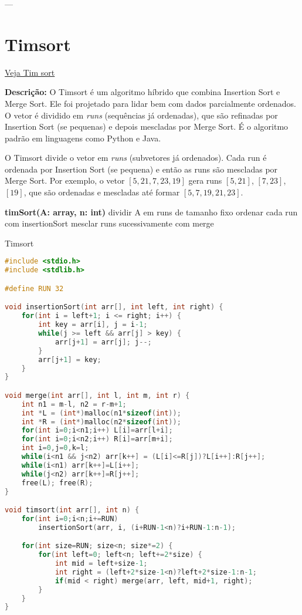---


\section{Timsort}

\href{https://www.algowalker.com/tim-sort.html}{Veja Tim sort}

\textbf{Descrição:} O Timsort é um algoritmo híbrido que combina Insertion Sort e Merge Sort. Ele foi projetado para lidar bem com dados parcialmente ordenados. O vetor é dividido em \textit{runs} (sequências já ordenadas), que são refinadas por Insertion Sort (se pequenas) e depois mescladas por Merge Sort. É o algoritmo padrão em linguagens como Python e Java.

\begin{exmp}
O Timsort divide o vetor em \textit{runs} (subvetores já ordenados). Cada run é ordenada por Insertion Sort (se pequena) e então as runs são mescladas por Merge Sort.  
Por exemplo, o vetor $[5, 21, 7, 23, 19]$ gera runs $[5, 21]$, $[7, 23]$, $[19]$, que são ordenadas e mescladas até formar $[5, 7, 19, 21, 23]$.
\end{exmp}

\begin{algorithm}[H]
\DontPrintSemicolon
\textbf{timSort(A: array, n: int)}\;
dividir A em runs de tamanho fixo\;
ordenar cada run com insertionSort\;
mesclar runs sucessivamente com merge\;
\caption{Timsort}
\label{lab:alg-timSort}
\end{algorithm}

\begin{lstlisting}[language=C, caption={Timsort simplificado em C}, label=code:timSortC]
#include <stdio.h>
#include <stdlib.h>

#define RUN 32

void insertionSort(int arr[], int left, int right) {
    for(int i = left+1; i <= right; i++) {
        int key = arr[i], j = i-1;
        while(j >= left && arr[j] > key) {
            arr[j+1] = arr[j]; j--;
        }
        arr[j+1] = key;
    }
}

void merge(int arr[], int l, int m, int r) {
    int n1 = m-l, n2 = r-m+1;
    int *L = (int*)malloc(n1*sizeof(int));
    int *R = (int*)malloc(n2*sizeof(int));
    for(int i=0;i<n1;i++) L[i]=arr[l+i];
    for(int i=0;i<n2;i++) R[i]=arr[m+i];
    int i=0,j=0,k=l;
    while(i<n1 && j<n2) arr[k++] = (L[i]<=R[j])?L[i++]:R[j++];
    while(i<n1) arr[k++]=L[i++];
    while(j<n2) arr[k++]=R[j++];
    free(L); free(R);
}

void timsort(int arr[], int n) {
    for(int i=0;i<n;i+=RUN)
        insertionSort(arr, i, (i+RUN-1<n)?i+RUN-1:n-1);

    for(int size=RUN; size<n; size*=2) {
        for(int left=0; left<n; left+=2*size) {
            int mid = left+size-1;
            int right = (left+2*size-1<n)?left+2*size-1:n-1;
            if(mid < right) merge(arr, left, mid+1, right);
        }
    }
}
\end{lstlisting}

